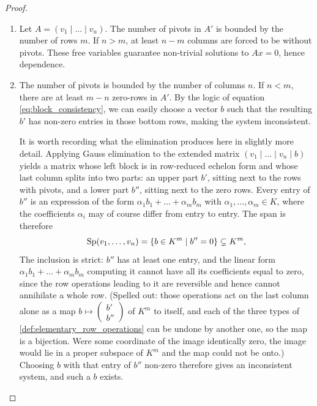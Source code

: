 \begin{proof}
\begin{enumerate}[label=\textbf{(\alph*)}]
    \item Let $A = (v_{1} \mid \dots \mid v_{n})$. The number of pivots in $A'$ is bounded by the number of rows $m$. If $n > m$, at least $n - m$ columns are forced to be without pivots. These free variables guarantee non-trivial solutions to $Ax = 0$, hence dependence.
    \item The number of pivots is bounded by the number of columns $n$. If $n < m$, there are at least $m - n$ zero-rows in $A'$. By the logic of equation \eqref{eq:block_consistency}, we can easily choose a vector $b$ such that the resulting $b'$ has non-zero entries in those bottom rows, making the system inconsistent.

    It is worth recording what the elimination produces here in slightly more detail. Applying Gauss elimination to the extended matrix $(v_{1} \mid \dots \mid v_{n} \mid b)$ yields a matrix whose left block is in row-reduced echelon form and whose last column splits into two parts: an upper part $b'$, sitting next to the rows with pivots, and a lower part $b''$, sitting next to the zero rows. Every entry of $b''$ is an expression of the form $\alpha_{1} b_{1} + \dots + \alpha_{m} b_{m}$ with $\alpha_{1}, \dots, \alpha_{m} \in K$, where the coefficients $\alpha_{i}$ may of course differ from entry to entry. The span is therefore
    \[
    \operatorname{Sp}(v_{1}, \dots, v_{n}) = \left\{ b \in K^{m} \;\middle|\; b'' = 0 \right\} \subsetneq K^{m},
    \]
    The inclusion is strict: $b''$ has at least one entry, and the linear form $\alpha_{1} b_{1} + \dots + \alpha_{m} b_{m}$ computing it cannot have all its coefficients equal to zero, since the row operations leading to it are reversible and hence cannot annihilate a whole row. (Spelled out: those operations act on the last column alone as a map $b \mapsto \left(\begin{smallmatrix} b' \\ b'' \end{smallmatrix}\right)$ of $K^{m}$ to itself, and each of the three types of \cref{def:elementary_row_operations} can be undone by another one, so the map is a bijection. Were some coordinate of the image identically zero, the image would lie in a proper subspace of $K^{m}$ and the map could not be onto.) Choosing $b$ with that entry of $b''$ non-zero therefore gives an inconsistent system, and such a $b$ exists.
\end{enumerate}
\end{proof}

